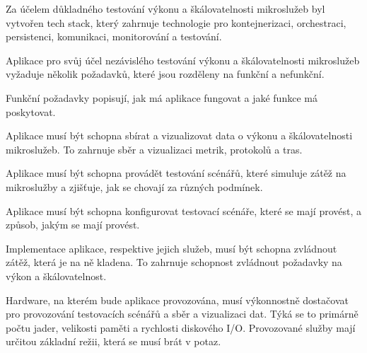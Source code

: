 


Za účelem důkladného testování výkonu a škálovatelnosti mikroslužeb byl vytvořen tech stack, který zahrnuje technologie pro kontejnerizaci, orchestraci, persistenci, komunikaci, monitorování a testování. 


Aplikace pro svůj účel nezávislého testování výkonu a škálovatelnosti mikroslužeb vyžaduje několik požadavků, které jsou rozděleny na funkční a nefunkční.


Funkční požadavky popisují, jak má aplikace fungovat a jaké funkce má poskytovat.


Aplikace musí být schopna sbírat a vizualizovat data o výkonu a škálovatelnosti mikroslužeb. To zahrnuje sběr a vizualizaci metrik, protokolů a tras.


Aplikace musí být schopna provádět testování scénářů, které simuluje zátěž na mikroslužby a zjišťuje, jak se chovají za různých podmínek.


Aplikace musí být schopna konfigurovat testovací scénáře, které se mají provést, a způsob, jakým se mají provést.



Implementace aplikace, respektive jejich služeb, musí být schopna zvládnout zátěž, která je na ně kladena. To zahrnuje schopnost zvládnout požadavky na výkon a škálovatelnost.


Hardware, na kterém bude aplikace provozována, musí výkonnostně dostačovat pro provozování testovacích scénářů a sběr a vizualizaci dat. Týká se to primárně počtu jader, velikosti paměti a rychlosti diskového I/O. Provozované služby mají určitou základní režii, která se musí brát v potaz.



